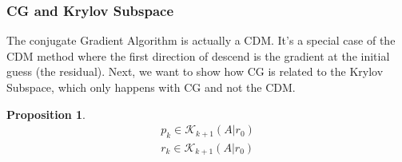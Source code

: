 \documentclass[]{article}
\theoremstyle{definition}
\newtheorem{prop}{Proposition}[section]  %
\begin{document}
        \subsubsection{CG and Krylov Subspace}\label{sec:CG_and_Krylov_Subspace}
            The conjugate Gradient Algorithm is actually a CDM. It's a special case of the CDM method where the first direction of descend is the gradient at the initial guess (the residual). Next, we want to show how CG is related to the Krylov Subspace, which only happens with CG and not the CDM. 
            \begin{prop}
                \begin{align}
                    p_k \in \mathcal K_{k + 1}(A|r_0)
                    \\
                    r_k \in \mathcal K_{k + 1}(A|r_0)
                \end{align}    
            \end{prop}
\end{document}

